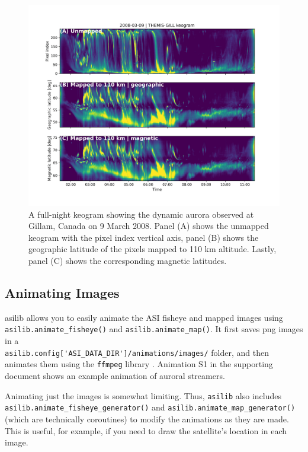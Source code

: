 \documentclass[utf8]{FrontiersinHarvard} %
\begin{document}
\begin{figure}
      \includegraphics[width=\textwidth]{figures/fig3.jpg}
      \caption{A full-night keogram showing the dynamic aurora observed at Gillam, Canada on 9 March 2008. Panel (A) shows the unmapped keogram with the pixel index vertical axis, panel (B) shows the geographic latitude of the pixels mapped to 110 km altitude. Lastly, panel (C) shows the corresponding magnetic latitudes.}
      \label{fig3}
\end{figure}


\subsection{Animating Images}
asilib allows you to easily animate the ASI fisheye and mapped images using \verb|asilib.animate_fisheye()| and \verb|asilib.animate_map()|. It first saves png images in a \\ \verb|asilib.config['ASI_DATA_DIR']/animations/images/| folder, and then animates them using the \verb|ffmpeg| library \citep{ffmpeg} . Animation S1 in the supporting document shows an example animation of auroral streamers.

Animating just the images is somewhat limiting. Thus, \verb|asilib| also includes \\ \verb|asilib.animate_fisheye_generator()| and \verb|asilib.animate_map_generator()| (which are technically coroutines) to modify the animations as they are made. This is useful, for example, if you need to draw the satellite's location in each image.
\end{document}
